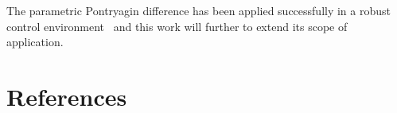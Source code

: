 \documentclass{elsarticle}
\theoremstyle{remark}
\theoremstyle{definition}
\begin{document}
The parametric Pontryagin difference has been applied successfully in a robust control environment~\cite{Schaich:2015,Schaich:2015a} and this work will further to extend its scope of application.

\section*{References}


\end{document}

